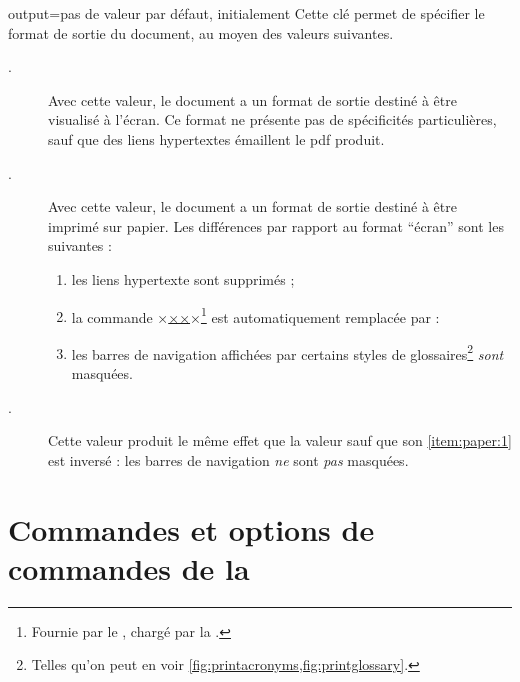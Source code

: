 \begin{docKey}{output}{=\textbar{}\textbar{}}{pas
    de valeur par défaut, initialement }
  Cette clé permet de spécifier le format de sortie du document, au moyen des
  valeurs suivantes.
  \begin{description}
  \item[.] Avec cette valeur, le document a un format de
    sortie destiné à être visualisé à l'écran. Ce format ne présente pas de
    spécificités particulières, sauf que des liens hypertextes émaillent le
    \acrshort{pdf} produit.
  \item[.] Avec cette valeur, le document a un format de sortie
    destiné à être imprimé sur papier. Les différences par rapport au format
    \enquote{écran} sont les suivantes :
    \begin{enumerate}
    \item les liens hypertexte sont supprimés ;
    \item la commande
      ×\href{×\meta{\acrshort*{url}}×}{××}×\footnote{Fournie par le
        , chargé par la \yatcl{}.} est automatiquement
      remplacée par :
    \item\label{item:paper:1} les barres de navigation affichées par certains
      styles de glossaires\footnote{Telles qu'on peut en voir
        \vref{fig:printacronyms,fig:printglossary}.} \emph{sont} masquées.
    \end{enumerate}
  \item[.] Cette valeur produit le même effet que la valeur
     sauf que son \vref{item:paper:1} est inversé : les barres
    de navigation \emph{ne} sont \emph{pas} masquées.
  \end{description}
\end{docKey}

\section{Commandes et options de commandes de la \yatcl}

